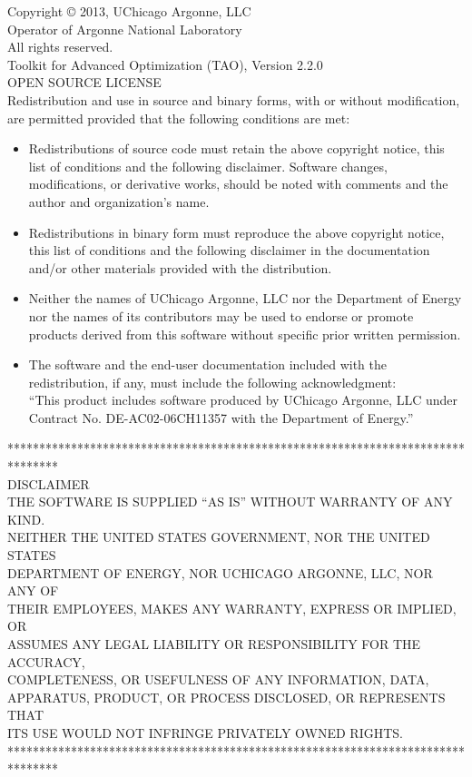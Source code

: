 \noindent
Copyright © 2013, UChicago Argonne, LLC \\
Operator of Argonne National Laboratory \\
All rights reserved. \\
Toolkit for Advanced Optimization (TAO), Version 2.2.0 \\
OPEN SOURCE LICENSE \\

\noindent
Redistribution and use in source and binary forms, with or without modification, are permitted provided that the following conditions are met:
\begin{itemize}
\item    Redistributions of source code must retain the above copyright notice, this list of conditions and the following disclaimer. Software changes, modifications, or derivative works, should be noted with comments and the author and organization's name. \\
\item    Redistributions in binary form must reproduce the above copyright notice, this list of conditions and the following disclaimer in the documentation and/or other materials provided with the distribution. \\
\item    Neither the names of UChicago Argonne, LLC nor the Department of Energy nor the names of its contributors may be used to endorse or promote products derived from this software without specific prior written permission. \\
\item    The software and the end-user documentation included with the redistribution, if any, must include the following acknowledgment:\\
    ``This product includes software produced by UChicago Argonne, LLC under Contract No. DE-AC02-06CH11357 with the Department of Energy.''
\end{itemize}

\noindent
********************************************************************************\\
\noindent
DISCLAIMER \\

\noindent
THE SOFTWARE IS SUPPLIED ``AS IS'' WITHOUT WARRANTY OF ANY KIND.\\
NEITHER THE UNITED STATES GOVERNMENT, NOR THE UNITED STATES\\
DEPARTMENT OF ENERGY, NOR UCHICAGO ARGONNE, LLC, NOR ANY OF\\
THEIR EMPLOYEES, MAKES ANY WARRANTY, EXPRESS OR IMPLIED, OR\\
ASSUMES ANY LEGAL LIABILITY OR RESPONSIBILITY FOR THE ACCURACY,\\
COMPLETENESS, OR USEFULNESS OF ANY INFORMATION, DATA,\\
APPARATUS, PRODUCT, OR PROCESS DISCLOSED, OR REPRESENTS THAT\\
ITS USE WOULD NOT INFRINGE PRIVATELY OWNED RIGHTS.\\

\noindent
********************************************************************************\\
